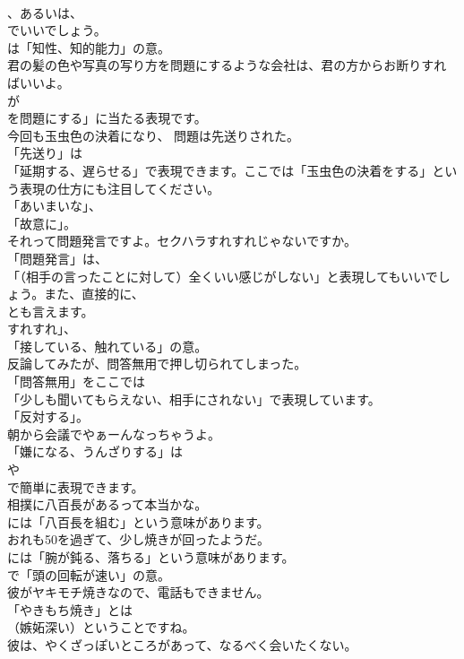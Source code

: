 \documentclass[8pt]{extreport}
\begin{document}
\begin{CJK}{UTF8}{min}
\\	、あるいは、
\\	でいいでしょう。
\\	は「知性、知的能力」の意。	
\\	君の髪の色や写真の写り方を問題にするような会社は、君の方からお断りすればいいよ。 
\\	が
\\	を問題にする」に当たる表現です。	
\\	今回も玉虫色の決着になり、 問題は先送りされた。 
\\	「先送り」は
\\	「延期する、遅らせる」で表現できます。ここでは「玉虫色の決着をする」という表現の仕方にも注目してください。
\\	「あいまいな」、
\\	「故意に」。	
\\	それって問題発言ですよ。セクハラすれすれじゃないですか。 
\\	「問題発言」は、
\\	「（相手の言ったことに対して）全くいい感じがしない」と表現してもいいでしょう。また、直接的に、
\\	とも言えます。
\\	すれすれ」、
\\	「接している、触れている」の意。	
\\	反論してみたが、問答無用で押し切られてしまった。 
\\	「問答無用」をここでは
\\	「少しも聞いてもらえない、相手にされない」で表現しています。
\\	「反対する」。	
\\	朝から会議でやぁーんなっちゃうよ。 
\\	「嫌になる、うんざりする」は
\\	や
\\	で簡単に表現できます。	
\\	相撲に八百長があるって本当かな。 
\\	には「八百長を組む」という意味があります。	
\\	おれも50を過ぎて、少し焼きが回ったようだ。 
\\	には「腕が鈍る、落ちる」という意味があります。
\\	で「頭の回転が速い」の意。	
\\	彼がヤキモチ焼きなので、電話もできません。 
\\	「やきもち焼き」とは
\\	（嫉妬深い）ということですね。	
\\	彼は、やくざっぽいところがあって、なるべく会いたくない。 

\end{CJK}
\end{document}
